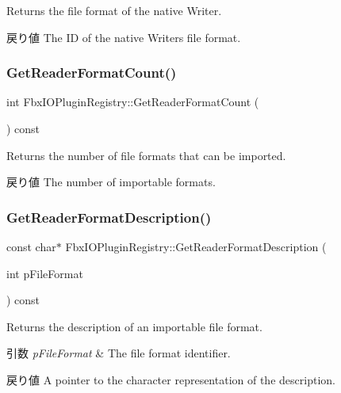 Returns the file format of the native Writer. \begin{DoxyReturn}{戻り値}
The ID of the native Writer\textquotesingle{}s file format. 
\end{DoxyReturn}
\mbox{\label{class_fbx_i_o_plugin_registry_a179517469d70cc8736339275b1e8a379}} 
\subsubsection{\texorpdfstring{Get\+Reader\+Format\+Count()}{GetReaderFormatCount()}}
{\footnotesize\ttfamily int Fbx\+I\+O\+Plugin\+Registry\+::\+Get\+Reader\+Format\+Count (\begin{DoxyParamCaption}{ }\end{DoxyParamCaption}) const}

Returns the number of file formats that can be imported. \begin{DoxyReturn}{戻り値}
The number of importable formats. 
\end{DoxyReturn}
\mbox{\label{class_fbx_i_o_plugin_registry_a2663a4ab5c9f0726bb0196497426bf22}} 
\subsubsection{\texorpdfstring{Get\+Reader\+Format\+Description()}{GetReaderFormatDescription()}}
{\footnotesize\ttfamily const char$\ast$ Fbx\+I\+O\+Plugin\+Registry\+::\+Get\+Reader\+Format\+Description (\begin{DoxyParamCaption}\item[{int}]{p\+File\+Format }\end{DoxyParamCaption}) const}

Returns the description of an importable file format. 
\begin{DoxyParams}{引数}
{\em p\+File\+Format} & The file format identifier. \\
\hline
\end{DoxyParams}
\begin{DoxyReturn}{戻り値}
A pointer to the character representation of the description. 
\end{DoxyReturn}
\mbox{\label{class_fbx_i_o_plugin_registry_aa7637c8cdebd8b808487d569d2639a3e}} 
